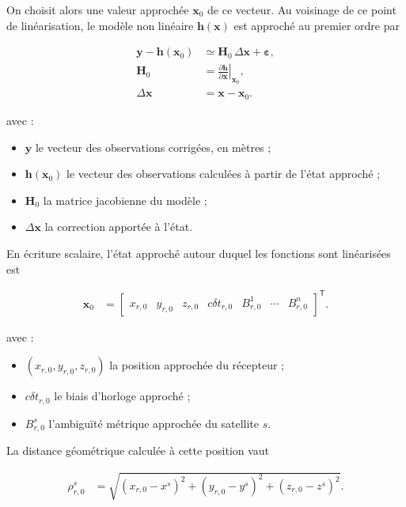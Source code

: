On choisit alors une valeur approchée $\mathbf x_0$ de ce vecteur. Au voisinage
de ce point de linéarisation, le modèle non linéaire
$\mathbf h(\mathbf x)$ est approché au premier ordre par

\begin{align}
\mathbf y-\mathbf h(\mathbf x_0)
&\simeq
\mathbf H_0\,\Delta\mathbf x+\boldsymbol\varepsilon,
\\
\mathbf H_0
&=
\left.
\frac{\partial\mathbf h}{\partial\mathbf x}
\right|_{\mathbf x_0},
\\
\Delta\mathbf x
&=
\mathbf x-\mathbf x_0.
\label{eq:linearized_model}
\end{align}

avec :

\begin{itemize}
    \item $\mathbf y$ le vecteur des observations corrigées, en mètres ;
    \item $\mathbf h(\mathbf x_0)$ le vecteur des observations calculées à
    partir de l'état approché ;
    \item $\mathbf H_0$ la matrice jacobienne du modèle ;
    \item $\Delta\mathbf x$ la correction apportée à l'état.
\end{itemize}

En écriture scalaire, l'état approché autour duquel les fonctions sont
linéarisées est

\begin{align}
\mathbf x_0
&=
\begin{bmatrix}
x_{r,0} & y_{r,0} & z_{r,0} & c\delta t_{r,0} &
B_{r,0}^{1} & \cdots & B_{r,0}^{n}
\end{bmatrix}^{\mathsf T}.
\label{eq:approximate_state}
\end{align}

avec :

\begin{itemize}
    \item $(x_{r,0},y_{r,0},z_{r,0})$ la position approchée du récepteur ;
    \item $c\delta t_{r,0}$ le biais d'horloge approché ;
    \item $B_{r,0}^{s}$ l'ambiguïté métrique approchée du satellite $s$.
\end{itemize}

La distance géométrique calculée à cette position vaut

\begin{align}
\rho_{r,0}^s
&=
\sqrt{(x_{r,0}-x^s)^2+(y_{r,0}-y^s)^2+(z_{r,0}-z^s)^2}.
\label{eq:geometric_range_at_initial_state}
\end{align}

